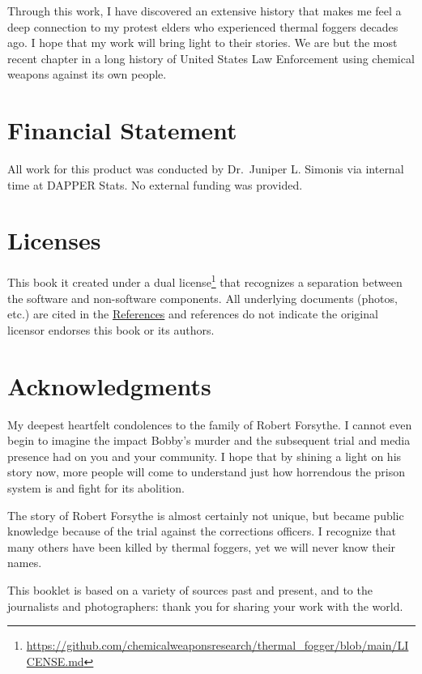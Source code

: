 \documentclass[
  11pt,
]{krantz}
\renewcommand{\href}[2]{#2\footnote{\url{#1}}}
\begin{document}
Through this work, I have discovered an extensive history that makes me feel a deep connection to my protest elders who experienced thermal foggers decades ago.
I hope that my work will bring light to their stories.
We are but the most recent chapter in a long history of United States Law Enforcement using chemical weapons against its own people.

\hypertarget{financial-statement}{%
\section*{Financial Statement}\label{financial-statement}}


All work for this product was conducted by Dr.~Juniper L. Simonis via internal time at DAPPER Stats.
No external funding was provided.

\hypertarget{licenses}{%
\section*{Licenses}\label{licenses}}


This book it created under a \href{https://github.com/chemicalweaponsresearch/thermal_fogger/blob/main/LICENSE.md}{dual license} that recognizes a separation between the software and non-software components.
All underlying documents (photos, etc.) are cited in the \protect\hyperlink{References}{References} and references do not indicate the original licensor endorses this book or its authors.

\hypertarget{acknowledgments}{%
\section*{Acknowledgments}\label{acknowledgments}}


My deepest heartfelt condolences to the family of Robert Forsythe.
I cannot even begin to imagine the impact Bobby's murder and the subsequent trial and media presence had on you and your community.
I hope that by shining a light on his story now, more people will come to understand just how horrendous the prison system is and fight for its abolition.

The story of Robert Forsythe is almost certainly not unique, but became public knowledge because of the trial against the corrections officers.
I recognize that many others have been killed by thermal foggers, yet we will never know their names.

This booklet is based on a variety of sources past and present, and to the journalists and photographers: thank you for sharing your work with the world.
\end{document}
